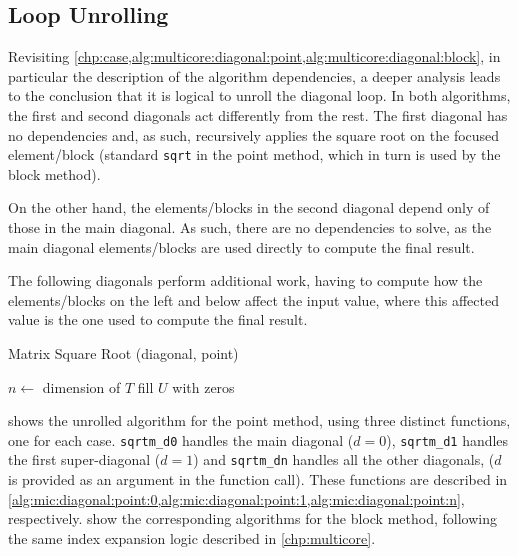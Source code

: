 \documentclass[../thesis]{subfiles}
\begin{document}
	\subsection{Loop Unrolling}
	\label{subsec:mic:optims:unroll}

	Revisiting \cref{chp:case,alg:multicore:diagonal:point,alg:multicore:diagonal:block}, in particular the description of the algorithm dependencies, a deeper analysis leads to the conclusion that it is logical to unroll the diagonal loop. In both algorithms, the first and second diagonals act differently from the rest. The first diagonal has no dependencies and, as such, recursively applies the square root on the focused element/block (standard \texttt{sqrt} in the point method, which in turn is used by the block method).

	On the other hand, the elements/blocks in the second diagonal depend only of those in the main diagonal. As such, there are no dependencies to solve, as the main diagonal elements/blocks are used directly to compute the final result.

	The following diagonals perform additional work, having to compute how the elements/blocks on the left and below affect the input value, where this affected value is the one used to compute the final result.

	\begin{algorithm}[htp]
		\caption[Matrix Square Root Unrolled (diagonal, point)]{Matrix Square Root (diagonal, point)}
		\label{alg:mic:diagonal:point}
		\DontPrintSemicolon



		$n \leftarrow$ dimension of $T$\;
		fill $U$ with zeros\;

		\;
		\;
	\end{algorithm}

	 shows the unrolled algorithm for the point method, using three distinct functions, one for each case. \texttt{sqrtm\_d0} handles the main diagonal ($d = 0$), \texttt{sqrtm\_d1} handles the first super-diagonal ($d = 1$) and \texttt{sqrtm\_dn} handles all the other diagonals, ($d$ is provided as an argument in the function call). These functions are described in \cref{alg:mic:diagonal:point:0,alg:mic:diagonal:point:1,alg:mic:diagonal:point:n}, respectively.  show the corresponding algorithms for the block method, following the same index expansion logic described in \cref{chp:multicore}.
\end{document}

